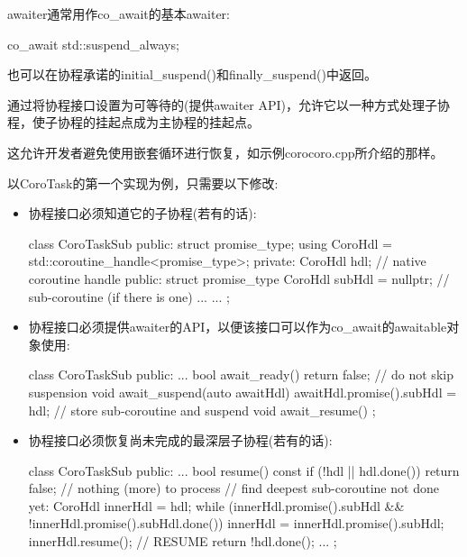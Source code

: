 awaiter通常用作co\_await的基本awaiter:

\begin{cpp}
co_await std::suspend_always{};
\end{cpp}

也可以在协程承诺的initial\_suspend()和finally\_suspend()中返回。


通过将协程接口设置为可等待的(提供awaiter API)，允许它以一种方式处理子协程，使子协程的挂起点成为主协程的挂起点。

这允许开发者避免使用嵌套循环进行恢复，如示例corocoro.cpp所介绍的那样。

以CoroTask的第一个实现为例，只需要以下修改:

\begin{itemize}
\item
协程接口必须知道它的子协程(若有的话):

\begin{cpp}
class CoroTaskSub {
public:
	struct promise_type;
	using CoroHdl = std::coroutine_handle<promise_type>;
private:
	CoroHdl hdl; // native coroutine handle
public:
	struct promise_type {
		CoroHdl subHdl = nullptr; // sub-coroutine (if there is one)
		...
	}
	...
};
\end{cpp}

\item
协程接口必须提供awaiter的API，以便该接口可以作为co\_await的awaitable对象使用:

\begin{cpp}
class CoroTaskSub {
	public:
	...
	bool await_ready() { return false; } // do not skip suspension
	void await_suspend(auto awaitHdl) {
		awaitHdl.promise().subHdl = hdl; // store sub-coroutine and suspend
	}
	void await_resume() { }
};
\end{cpp}

\item
协程接口必须恢复尚未完成的最深层子协程(若有的话):

\begin{cpp}
class CoroTaskSub {
	public:
	...
	bool resume() const {
		if (!hdl || hdl.done()) {
			return false; // nothing (more) to process
		}
		// find deepest sub-coroutine not done yet:
		CoroHdl innerHdl = hdl;
		while (innerHdl.promise().subHdl && !innerHdl.promise().subHdl.done()) {
			innerHdl = innerHdl.promise().subHdl;
		}
		innerHdl.resume(); // RESUME
		return !hdl.done();
	}
	...
};
\end{cpp}
\end{itemize}

